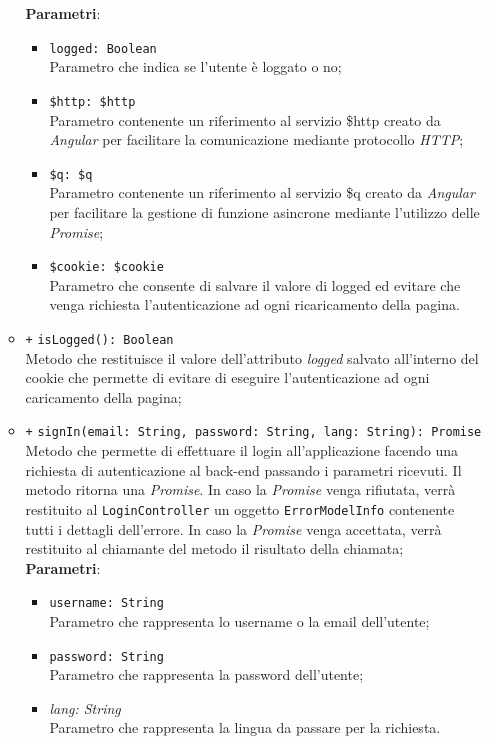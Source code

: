 \begin{itemize}
\begin{itemize}
		\textbf{Parametri}:
		\begin{itemize}
			\item \texttt{logged: Boolean} \\ Parametro che indica se l'utente è loggato o no;
			\item \texttt{\$http: \$http} \\ Parametro contenente un riferimento al servizio \$http creato da \textit{Angular} per facilitare la comunicazione mediante protocollo \textit{HTTP};
			\item \texttt{\$q: \$q} \\ Parametro contenente un riferimento al servizio \$q creato da \textit{Angular} per facilitare la gestione di funzione asincrone mediante l’utilizzo delle \textit{Promise};
			\item \texttt{\$cookie: \$cookie} \\ Parametro che consente di salvare il valore di logged ed evitare che venga richiesta l'autenticazione ad ogni ricaricamento della pagina.
		\end{itemize}
		\item \texttt{+} \texttt{isLogged(): Boolean} \\ Metodo che restituisce il valore dell'attributo \textit{logged} salvato all'interno del cookie che permette di evitare di eseguire l'autenticazione ad ogni caricamento della pagina;
		 
		\item \texttt{+} \texttt{signIn(email: String, password: String, lang: String): Promise}\\ Metodo che permette di effettuare il login all'applicazione facendo una richiesta di autenticazione al back-end passando i parametri ricevuti. Il metodo ritorna una \textit{Promise}. In caso la \textit{Promise} venga rifiutata, verrà restituito al \texttt{LoginController} un oggetto \texttt{ErrorModelInfo} contenente tutti i dettagli dell'errore. In caso la \textit{Promise} venga accettata, verrà restituito al chiamante del metodo il risultato della chiamata; \\
			\textbf{Parametri}: 
			\begin{itemize}
				\item \texttt{username: String} \\ Parametro che rappresenta lo username o la email dell'utente;
				\item \texttt{password: String} \\ Parametro che rappresenta la password dell'utente;
				\item \textit{lang: String} \\ Parametro che rappresenta la lingua da passare per la richiesta.
			\end{itemize}
			

\end{itemize}
\end{itemize}
